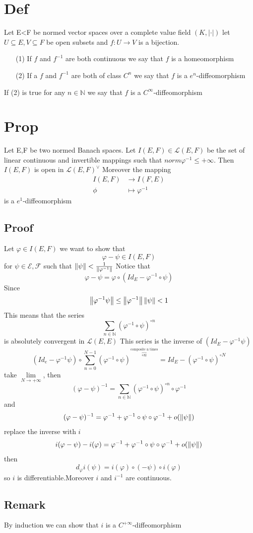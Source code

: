 \documentclass{book}
\newcommand{\abs}[1]{\left\lvert #1 \right\rvert}
\begin{document}
\section{Def}
Let E<F be normed vector spaces over a complete value field $(K,\abs\cdot)$ let $U\subseteq E,V\subseteq F$ be open subsets and $f:U\rightarrow V$ is a bijection. 
\begin{itemize}
    \item[(1)] If $f$ and $f^{-1}$ are both continuous we say that $f$ is a homeomorphism 
    \item[(2)] If a $f$ and $f^{-1}$ are both of class $C^n$ we say that $f$ is a $e^n$-diffeomorphism
\end{itemize}
If (2) is true for any $n\in \mathbb{N}$ we say that $f$ is a $C^\infty$-diffeomorphism
\section{Prop}
Let E,F be two normed Banach spaces. Let $I(E,F)\in \mathscr{L}(E,F)$ be the set of linear continuous and invertible mappings such that $norm{\varphi^{-1}}\leq+\infty$. Then $I(E,F)$ is open in $\mathscr{L}(E,F)^\vee$ Moreover the mapping 
$$\begin{aligned}
    I(E,F)&\rightarrow I(F,E)\\
    \phi &\mapsto\varphi^{-1}
\end{aligned}$$
is a $e^1$-diffeomorphism
\subsection*{Proof}
Let $\varphi\in I(E,F)$ we want to show that $$\varphi-\psi\in I(E,F)$$
for $\psi\in \mathscr{E,F}$ such that $\left\lVert \psi \right\rVert<\frac{1}{\left\lVert \varphi^{-1} \right\rVert}$
Notice that $$\varphi-\psi=\varphi\circ(Id_E-\varphi^{-1}\circ\psi)$$
Since $$\left\lVert \varphi^{-1}\psi \right\rVert\leq\left\lVert \varphi^{-1} \right\rVert\left\lVert \psi \right\rVert<1$$
This means that the series$$\sum\limits_{n\in \mathbb{N}}(\varphi^{-1}\circ\psi)^{\circ n}$$ is absolutely convergent in $\mathscr{L}(E,E)$
This series is the inverse of $(Id_E-\varphi^{-1}\psi)$
$$(Id_e-\varphi^{-1}\psi)\circ\sum\limits_{n=0}^{N-1}(\varphi^{-1}\circ\psi)^{\overbrace{\circ n}\limits^{\text{composite n times}}}=Id_E-(\varphi^{-1}\circ\psi)^{\circ N}$$ 
take $\lim\limits_{N\rightarrow +\infty}$, then
$$(\varphi-\psi)^{-1}=\sum\limits_{n\in \mathbb{N}}(\varphi^{-1}\circ\psi)^{\circ n}\circ\varphi^{-1}$$
and $$(\varphi-\psi)^{-1}=\varphi^{-1}+\varphi^{-1}\circ\psi\circ\varphi^{-1}+o(\left\lVert \psi \right\rVert)$$
replace the inverse with $i$
$$i(\varphi-\psi)-i(\varphi)=\varphi^{-1}+\varphi^{-1}\circ\psi\circ\varphi^{-1}+o(\left\lVert \psi \right\rVert)$$
then $$d_\varphi i(\psi)=i(\varphi)\circ(-\psi)\circ i(\varphi)$$
so $i$ is differentiable.Moreover $i$ and $i^{-1}$ are continuous.\subsection*{Remark}
By induction we can show that $i$ is a $C^{+\infty}$-diffeomorphism
\end{document}
